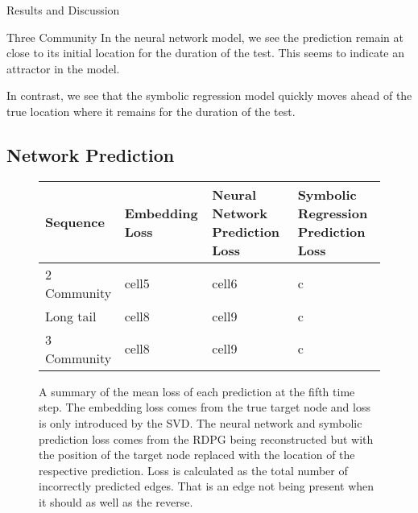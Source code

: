 \documentclass[12pt]{amsart}
\begin{document}
\begin{section}{Results and Discussion}
\begin{subsection}{Three Community}
        In the neural network model, we see the prediction remain at close to its initial location for the duration of the test. This seems to indicate an attractor in the model.

        In contrast, we see that the symbolic regression model quickly moves ahead of the true location where it remains for the duration of the test.


        \subsection{Network Prediction}
        \begin{figure}
            \begin{center}
                \begin{tabular}{| m{} | m{} | m{} | m{} |}
                 \hline
                 Sequence & Embedding Loss & Neural Network Prediction Loss & Symbolic Regression Prediction Loss\\ 
                 \hline
                 \hline
                 2 Community & cell5 & cell6 & c\\ 
                 \hline 
                 Long tail & cell8 & cell9 & c \\ 
                 \hline 
                 3 Community & cell8 & cell9 & c \\ 
                 \hline 
                \end{tabular}
                \end{center}
                \caption{A summary of the mean loss of each prediction at the fifth time step. The embedding loss comes from the true target node and loss is only introduced by the SVD. The neural network and symbolic prediction loss comes from the RDPG being reconstructed but with the position of the target node replaced with the location of the respective prediction. Loss is calculated as the total number of incorrectly predicted edges. That is an edge not being present when it should as well as the reverse.}
        \end{figure}

\end{subsection}
\end{section}
\end{document}
